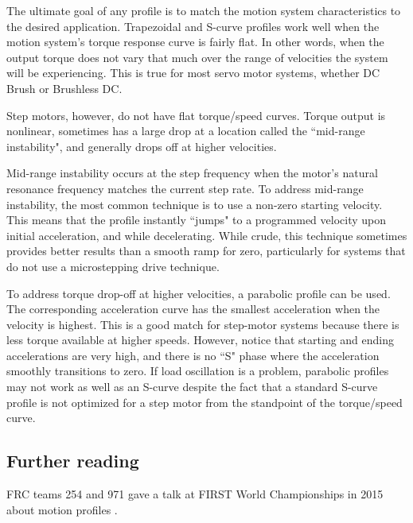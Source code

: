 The ultimate goal of any profile is to match the motion system characteristics
to the desired application. Trapezoidal and S-curve profiles work well when the
motion system's torque response curve is fairly flat. In other words, when the
output torque does not vary that much over the range of velocities the system
will be experiencing. This is true for most servo motor systems, whether DC
Brush or Brushless DC.

Step motors, however, do not have flat torque/speed curves. Torque output is
nonlinear, sometimes has a large drop at a location called the ``mid-range
instability", and generally drops off at higher velocities.

Mid-range instability occurs at the step frequency when the motor's natural
resonance frequency matches the current step rate. To address mid-range
instability, the most common technique is to use a non-zero starting velocity.
This means that the profile instantly ``jumps" to a programmed velocity upon
initial acceleration, and while decelerating. While crude, this technique
sometimes provides better results than a smooth ramp for zero, particularly for
systems that do not use a microstepping drive technique.

To address torque drop-off at higher velocities, a parabolic profile can be
used. The corresponding acceleration curve has the smallest acceleration when
the velocity is highest. This is a good match for step-motor systems because
there is less torque available at higher speeds. However, notice that starting
and ending accelerations are very high, and there is no ``S" phase where the
acceleration smoothly transitions to zero. If load oscillation is a problem,
parabolic profiles may not work as well as an S-curve despite the fact that a
standard S-curve profile is not optimized for a step motor from the standpoint
of the torque/speed curve.

\subsection{Further reading}

FRC teams 254 and 971 gave a talk at FIRST World Championships in 2015 about
motion profiles \cite{bib:motion-profiles}.
